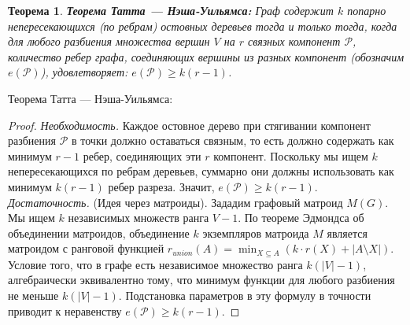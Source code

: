 \documentclass[12pt, a4paper]{article}
\newtheorem{theorem}{Теорема}
\begin{document}
\begin{theorem}
\textbf{Теорема Татта — Нэша-Уильямса:} Граф содержит $k$ попарно непересекающихся (по ребрам) остовных деревьев тогда и только тогда, когда для любого разбиения множества вершин $V$ на $r$ связных компонент $\mathcal{P}$, количество ребер графа, соединяющих вершины из разных компонент (обозначим $e(\mathcal{P})$), удовлетворяет:
$e(\mathcal{P}) \ge k(r-1)$.
\end{theorem}{Теорема Татта — Нэша-Уильямса:}
\begin{proof}
\textit{Необходимость.} Каждое остовное дерево при стягивании компонент разбиения $\mathcal{P}$ в точки должно оставаться связным, то есть должно содержать как минимум $r-1$ ребер, соединяющих эти $r$ компонент. Поскольку мы ищем $k$ непересекающихся по ребрам деревьев, суммарно они должны использовать как минимум $k(r-1)$ ребер разреза. Значит, $e(\mathcal{P}) \ge k(r-1)$.\\
\textit{Достаточность.} (Идея через матроиды). Зададим графовый матроид $M(G)$. Мы ищем $k$ независимых множеств ранга $V-1$. По теореме Эдмондса об объединении матроидов, объединение $k$ экземпляров матроида $M$ является матроидом с ранговой функцией $r_{union}(A) = \min_{X \subseteq A} (k \cdot r(X) + |A \setminus X|)$. Условие того, что в графе есть независимое множество ранга $k(|V|-1)$, алгебраически эквивалентно тому, что минимум функции для любого разбиения не меньше $k(|V|-1)$. Подстановка параметров в эту формулу в точности приводит к неравенству $e(\mathcal{P}) \ge k(r-1)$.
\end{proof}
\end{document}
